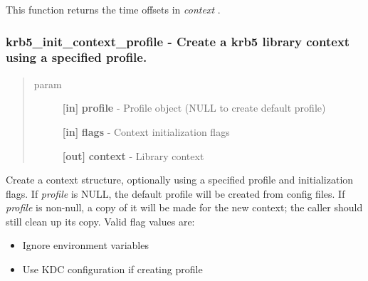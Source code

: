 \documentclass[letterpaper,10pt,english]{sphinxmanual}
\begin{document}
This function returns the time offsets in \emph{context} .


\subsubsection{krb5\_init\_context\_profile -  Create a krb5 library context using a specified profile.}
\label{appdev/refs/api/krb5_init_context_profile:krb5-init-context-profile-create-a-krb5-library-context-using-a-specified-profile}\label{appdev/refs/api/krb5_init_context_profile::doc}

\begin{fulllineitems}
\label{appdev/refs/api/krb5_init_context_profile:krb5_init_context_profile}
\end{fulllineitems}

\begin{quote}\begin{description}
\item[{param}] \leavevmode
\textbf{{[}in{]}} \textbf{profile} - Profile object (NULL to create default profile)

\textbf{{[}in{]}} \textbf{flags} - Context initialization flags

\textbf{{[}out{]}} \textbf{context} - Library context

\end{description}\end{quote}

Create a context structure, optionally using a specified profile and initialization flags. If \emph{profile} is NULL, the default profile will be created from config files. If \emph{profile} is non-null, a copy of it will be made for the new context; the caller should still clean up its copy. Valid flag values are:
\begin{itemize}
\item {} 
{\hyperref[appdev/refs/macros/KRB5_INIT_CONTEXT_SECURE:KRB5_INIT_CONTEXT_SECURE]{}} Ignore environment variables

\item {} 
{\hyperref[appdev/refs/macros/KRB5_INIT_CONTEXT_KDC:KRB5_INIT_CONTEXT_KDC]{}} Use KDC configuration if creating profile

\end{itemize}
\end{document}
